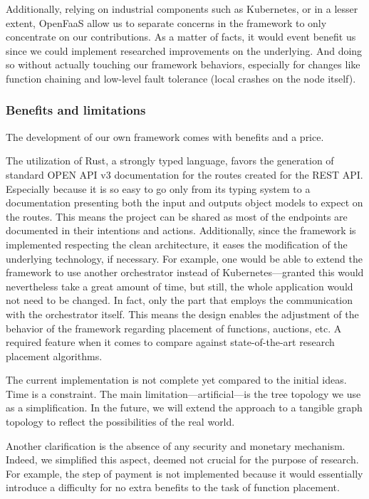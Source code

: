 Additionally, relying on industrial components such as Kubernetes, or in a lesser extent, OpenFaaS allow us to separate concerns in the framework to only concentrate on our contributions. As a matter of facts, it would event benefit us since we could implement researched improvements on the underlying. And doing so without actually touching our framework behaviors, especially for changes like function chaining and low-level fault tolerance (local crashes on the node itself).


\subsubsection{Benefits and limitations}

The development of our own framework comes with benefits and a price.

The utilization of Rust, a strongly typed language, favors the generation of standard OPEN API v3 documentation for the routes created for the \gls{REST} \gls{API}. Especially because it is so easy to go only from its typing system to a documentation presenting both the input and outputs object models to expect on the routes. This means the project can be shared as most of the endpoints are documented in their intentions and actions. Additionally, since the framework is implemented respecting the clean architecture, it eases the modification of the underlying technology, if necessary. For example, one would be able to extend the framework to use another orchestrator instead of Kubernetes—granted this would nevertheless take a great amount of time, but still, the whole application would not need to be changed. In fact, only the part that employs the communication with the orchestrator itself. This means the design enables the adjustment of the behavior of the framework regarding placement of functions, auctions, etc. A required feature when it comes to compare against state-of-the-art research placement algorithms.

The current implementation is not complete yet compared to the initial ideas. Time is a constraint. The main limitation—artificial—is the tree topology we use as a simplification. In the future, we will extend the approach to a tangible graph topology to reflect the possibilities of the real world.

Another clarification is the absence of any security and monetary mechanism. Indeed, we simplified this aspect, deemed not crucial for the purpose of research. For example, the step of payment is not implemented because it would essentially introduce a difficulty for no extra benefits to the task of function placement.

